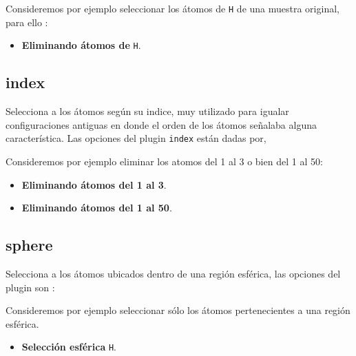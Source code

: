 Consideremos por ejemplo seleccionar los \'atomos de \verb|H| de una muestra original, para ello :

\begin{itemize}
 \item \textbf{Eliminando \'atomos de} \texttt{H}.
\end{itemize}


\subsection{index}
Selecciona a los \'atomos seg\'un su indice, muy utilizado para igualar configuraciones antiguas en donde el orden de los \'atomos se\~nalaba alguna caracter\'istica. Las opciones del plugin \verb|index| est\'an dadas por,


Consideremos por ejemplo eliminar los atomos del 1 al 3 o bien del 1 al 50:

\begin{itemize}
 \item \textbf{Eliminando \'atomos del 1 al 3}.
 \item \textbf{Eliminando \'atomos del 1 al 50}.
\end{itemize}

\subsection{sphere}
Selecciona a los \'atomos ubicados dentro de una regi\'on esf\'erica, las opciones del plugin son :


Consideremos por ejemplo seleccionar s\'olo los \'atomos pertenecientes a una regi\'on esf\'erica.

\begin{itemize}
 \item \textbf{Selecci\'on esf\'erica} \texttt{H}.
\end{itemize}

